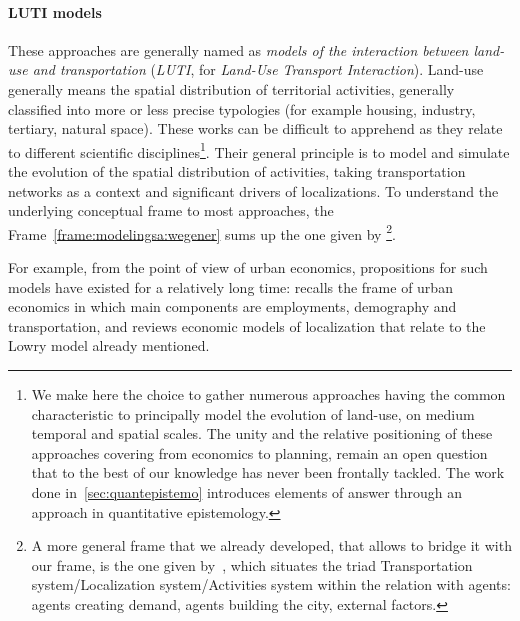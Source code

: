 \documentclass[galley]{jtlu-article-2col}
\begin{document}
\paragraph{LUTI models}

These approaches are generally named as \emph{models of the interaction between land-use and transportation} (\emph{LUTI}, for \textit{Land-Use Transport Interaction}). Land-use generally means the spatial distribution of territorial activities, generally classified into more or less precise typologies (for example housing, industry, tertiary, natural space). These works can be difficult to apprehend as they relate to different scientific disciplines\footnote{We make here the choice to gather numerous approaches having the common characteristic to principally model the evolution of land-use, on medium temporal and spatial scales. The unity and the relative positioning of these approaches covering from economics to planning, remain an open question that to the best of our knowledge has never been frontally tackled. The work done in~\ref{sec:quantepistemo} introduces elements of answer through an approach in quantitative epistemology.}. Their general principle is to model and simulate the evolution of the spatial distribution of activities, taking transportation networks as a context and significant drivers of localizations. To understand the underlying conceptual frame to most approaches, the Frame~\ref{frame:modelingsa:wegener} sums up the one given by \cite{wegener2004land}\footnote{A more general frame that we already developed, that allows to bridge it with our frame, is the one given by~\cite{le2010approche}, which situates the triad Transportation system/Localization system/Activities system within the relation with agents: agents creating demand, agents building the city, external factors.}.

For example, from the point of view of urban economics, propositions for such models have existed for a relatively long time: \cite{putman1975urban} recalls the frame of urban economics in which main components are employments, demography and transportation, and reviews economic models of localization that relate to the Lowry model already mentioned.
\end{document}
